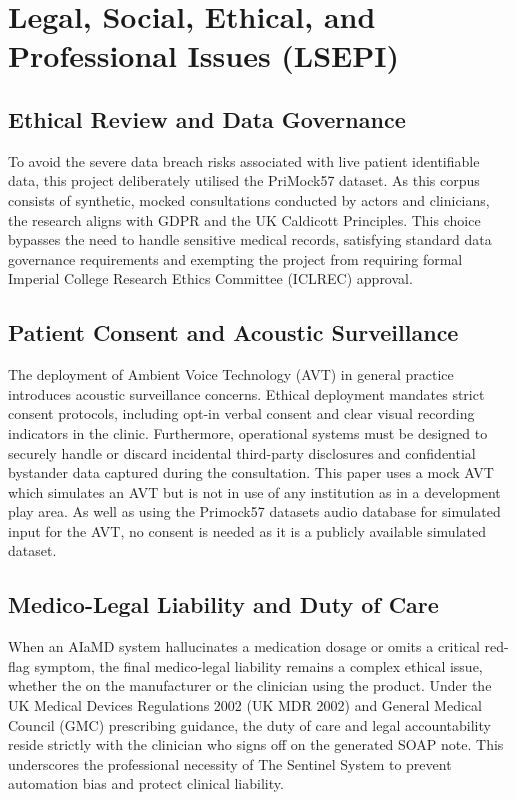 \documentclass[11pt,a4paper]{article}
\begin{document}
\section{Legal, Social, Ethical, and Professional Issues (LSEPI)}

\subsection{Ethical Review and Data Governance}

To avoid the severe data breach risks associated with live patient identifiable data, this project deliberately utilised the PriMock57 dataset. As this corpus consists of synthetic, mocked consultations conducted by actors and clinicians, the research aligns with GDPR and the UK Caldicott Principles. This choice bypasses the need to handle sensitive medical records, satisfying standard data governance requirements and exempting the project from requiring formal Imperial College Research Ethics Committee (ICLREC) approval.

\subsection{Patient Consent and Acoustic Surveillance}
The deployment of Ambient Voice Technology (AVT) in general practice introduces acoustic surveillance concerns. Ethical deployment mandates strict consent protocols, including opt-in verbal consent and clear visual recording indicators in the clinic. Furthermore, operational systems must be designed to securely handle or discard incidental third-party disclosures and confidential bystander data captured during the consultation. This paper uses a mock AVT which simulates an AVT but is not in use of any institution as in a development play area. As well as using the Primock57 datasets audio database for simulated input for the AVT, no consent is needed as it is a publicly available simulated dataset.

\subsection{Medico-Legal Liability and Duty of Care}

When an AIaMD system hallucinates a medication dosage or omits a critical red-flag symptom, the final medico-legal liability remains a complex ethical issue, whether the on the manufacturer or the clinician using the product. Under the UK Medical Devices Regulations 2002 (UK MDR 2002) \cite{UKMDR2002}  and General Medical Council (GMC) \cite{GMC2024GoodMedicalPractice} prescribing guidance, the duty of care and legal accountability reside strictly with the clinician who signs off on the generated SOAP note. This underscores the professional necessity of The Sentinel System to prevent automation bias and protect clinical liability.  
\end{document}
